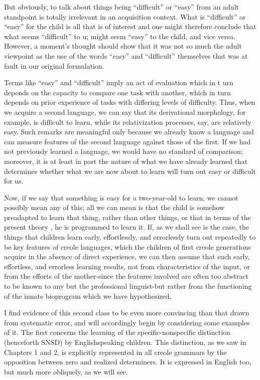 But obviously, to talk about things being ``difficult'' or ``easy'' from an adult standpoint is totally irrelevant in an acquisition context. What is ``difficult'' or ``easy'' for the child is all that is of interest and one might therefore conclude that what seems ``difficult'' to u; might seem ``easy'' to the child, and vice versa. However, a moment's
thought should show that it was not so much the adult viewpoint as the use of the words ``easy'' and ``difficult'' themselves that was at fault in our original formulation.

Terms like ``easy'' and ``difficult'' imply an act of evaluation
which in t urn depends on the capacity to compare one task with another, which in turn depends on prior experience of tasks with differing levels of difficulty. Thus, when we acquire a second language, we can say that its derivational morphology, for example, is difficult to learn, while its relativization processes, say, are relatively easy. Such remarks are meaningful only because we already know a language and can measure features of the second language against those of the first. If we had not previously learned a language, we would have no standard of comparison; moreover, it is at least in part the nature of what we have already learned that determines whether what we are now about to learn will turn out easy or difficult for us.

Now, if we say that something is easy for a two-year-old to
learn, we cannot possibly mean any of this; all we can mean is that the child is somehow preadapted to learn that thing, rather than other things, or that in terms of the present theory , he is programmed to learn it. If, as we shall see is the case, the things that children learn early, effortlessly, and errorlessly turn out repeatedly to be key features of creole languages, which the children of first creole generations acquire in the absence of direct experience, we can then assume that such early, effortless, and errorless learning results, not from charac\-teristics of the input, or from the efforts of the mother-since the features involved are often too abstract to be known to any but the professional linguist-but rather from the functioning of the innate bioprogram which we have hypothesized.

I find evidence of this second class to be even more convincing
than that drawn from systematic error, and will accordingly begin by considering some examples of it. The first concerns the learning of the specific-nonspecific distinction (henceforth SNSD) by English\-speaking children. This distinction, as we saw in Chapters 1 and 2, is explicitly represented in all creole grammars by the opposition
between zero and realized determiners. It is expressed in English too, but much more obliquely, as we will see.

